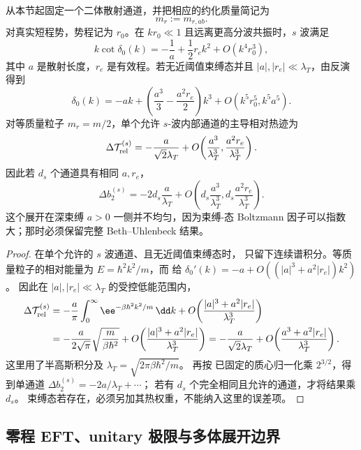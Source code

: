 从本节起固定一个二体散射通道，并把相应的约化质量简记为
\[
 m_r:=m_{r,ab}.
\]
对真实短程势，势程记为 \(r_0\)。在 \(kr_0\ll1\) 且远离更高分波共振时，\(s\) 波满足
\begin{equation}
 k\cot\delta_0(k)
 =-\frac1a+\frac12r_e k^2+O(k^4r_0^3),
 \label{eq:phys-sm-effective-range}
\end{equation}
其中 \(a\) 是散射长度，\(r_e\) 是有效程。若无近阈值束缚态并且 \(|a|,|r_e|\ll\lambda_T\)，由反演得到
\begin{equation}
 \delta_0(k)
 =-ak+
 \left(\frac{a^3}{3}-\frac{a^2r_e}{2}\right)k^3
 +O(k^5r_0^5,k^5a^5).
 \label{eq:phys-sm-phase-low}
\end{equation}
对等质量粒子 \(m_r=m/2\)，单个允许 \(s\)-波内部通道的主导相对热迹为
\[
 \Delta\mathcal T_{\rm rel}^{(s)}
 =-\frac{a}{\sqrt2\lambda_T}
 +O\!\left(\frac{a^3}{\lambda_T^3},
 \frac{a^2r_e}{\lambda_T^3}\right).
\]
因此若 \(d_s\) 个通道具有相同 \(a,r_e\)，
\begin{equation}
 \Delta b_2^{(s)}
 =-2d_s\frac{a}{\lambda_T}
 +O\!\left(
 d_s\frac{a^3}{\lambda_T^3},
 d_s\frac{a^2r_e}{\lambda_T^3}
 \right).
 \label{eq:phys-sm-bu-low-energy}
\end{equation}
这个展开在深束缚 \(a>0\) 一侧并不均匀，因为束缚-态 Boltzmann 因子可以指数大；那时必须保留完整 Beth--Uhlenbeck 结果。

\begin{proof}
在单个允许的 \(s\) 波通道、且无近阈值束缚态时，
 只留下连续谱积分。等质量粒子的相对能量为 \(E=\hbar^2k^2/m\)，而
 给
\(\delta_0'(k)=-a+O((|a|^3+a^2|r_e|)k^2)\)。
因此在 \(|a|,|r_e|\ll\lambda_T\) 的受控低能范围内，
\[
\begin{aligned}
\Delta\mathcal T_{\rm rel}^{(s)}
&=-\frac a\pi
\int_0^\infty\ee^{-\beta\hbar^2k^2/m}\,\dd k
+O\!\left(\frac{|a|^3+a^2|r_e|}{\lambda_T^3}\right)\\
&=-\frac{a}{2\sqrt\pi}
 \sqrt{\frac{m}{\beta\hbar^2}}
+O\!\left(\frac{|a|^3+a^2|r_e|}{\lambda_T^3}\right)
=-\frac{a}{\sqrt2\lambda_T}
+O\!\left(\frac{a^3+a^2|r_e|}{\lambda_T^3}\right).
\end{aligned}
\]
这里用了半高斯积分及
\(\lambda_T=\sqrt{2\pi\beta\hbar^2/m}\)。
再按 已固定的质心归一化乘
\(2^{3/2}\)，得到单通道
\(\Delta b_2^{(s)}=-2a/\lambda_T+\cdots\)；
若有 \(d_s\) 个完全相同且允许的通道，才将结果乘 \(d_s\)。
束缚态若存在，必须另加其热权重，不能纳入这里的误差项。
\end{proof}

\subsection{零程 EFT、unitary 极限与多体展开边界}

